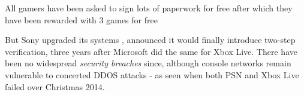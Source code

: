 \documentclass[a4paper,12pt]{article}
\begin{document}
All gamers have been asked to sign lots of paperwork for free after which they have been rewarded with 3 games for free

But Sony upgraded its systems , announced it would finally introduce two-step verification, three years after Microsoft did the same for Xbox Live. There have been no widespread \emph{security breaches} since, although console networks remain vulnerable to concerted DDOS attacks - as seen when both PSN and Xbox Live failed over Christmas 2014.
\end{document}
